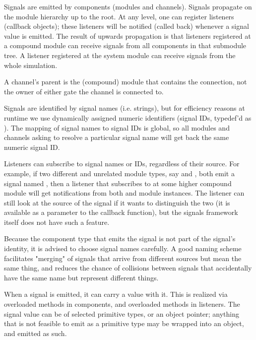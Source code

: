 Signals are emitted by components (modules and channels). Signals propagate
on the module hierarchy up to the root. At any level, one can register
listeners (callback objects); these listeners will be notified (called
back) whenever a signal value is emitted. The result of upwards propagation
is that listeners registered at a compound module can receive signals from
all components in that submodule tree. A listener registered at the system
module can receive signals from the whole simulation.

\begin{note}
    A channel's parent is the (compound) module that contains the connection,
    not the owner of either gate the channel is connected to.
\end{note}

Signals are identified by signal names (i.e. strings), but for efficiency reasons
at runtime we use dynamically assigned numeric identifiers (signal IDs,
typedef'd as ). The mapping of signal names to signal IDs is
global, so all modules and channels asking to resolve a particular signal name
will get back the same numeric signal ID.

Listeners can subscribe to signal names or IDs, regardless of their
source. For example, if two different and unrelated module types, say
 and , both emit a signal named , then
a listener that subscribes to  at some higher compound module
will get notifications from both  and  module
instances. The listener can still look at the source of the signal if it
wants to distinguish the two (it is available as a parameter to the
callback function), but the signals framework itself does not have such a
feature.

\begin{note}
  Because the component type that emits the signal is not part of the signal's
  identity, it is advised to choose signal names carefully. A good naming scheme
  facilitates "merging" of signals that arrive from different sources but
  mean the same thing, and reduces the chance of collisions between signals that
  accidentally have the same name but represent different things.
\end{note}

When a signal is emitted, it can carry a value with it. This is realized via
overloaded  methods in components, and overloaded 
methods in listeners. The signal value can be of selected primitive types, or an
object pointer; anything that is not feasible to emit as a primitive type may be
wrapped into an object, and emitted as such.

